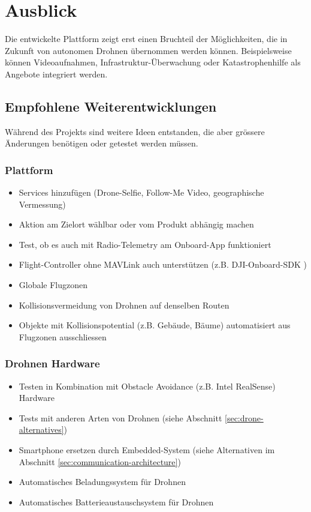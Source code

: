 \section{Ausblick}

Die entwickelte Plattform zeigt erst einen Bruchteil der Möglichkeiten, die in Zukunft von autonomen Drohnen übernommen werden können. Beispielsweise können Videoaufnahmen, Infrastruktur-Überwachung oder Katastrophenhilfe als Angebote integriert werden. 

\subsection{Empfohlene Weiterentwicklungen}

Während des Projekts sind weitere Ideen entstanden, die aber grössere Änderungen benötigen oder getestet werden müssen. 

\subsubsection{Plattform}

\begin{itemize}
	\item Services hinzufügen (Drone-Selfie, Follow-Me Video, geographische Vermessung)
	\item Aktion am Zielort wählbar oder vom Produkt abhängig machen
	\item Test, ob es auch mit Radio-Telemetry am Onboard-App funktioniert
	\item \Gls{Flight-Controller} ohne \Gls{MAVLink} auch unterstützen (z.B. DJI-Onboard-SDK \cite{dji-sdk})
	\item Globale Flugzonen
	\item Kollisionsvermeidung von Drohnen auf denselben Routen
	\item Objekte mit Kollisionspotential (z.B. Gebäude, Bäume) automatisiert aus Flugzonen ausschliessen
\end{itemize}

\subsubsection{Drohnen Hardware} 
\begin{itemize}
	\item Testen in Kombination mit Obstacle Avoidance (z.B. Intel RealSense\cite{realsense}) Hardware
		\item Tests mit anderen Arten von Drohnen (siehe Abschnitt \ref{sec:drone-alternatives})
	\item Smartphone ersetzen durch Embedded-System (siehe Alternativen im Abschnitt \ref{sec:communication-architecture}) 

	\item Automatisches Beladungssystem für Drohnen
	\item Automatisches Batterieaustauschsystem für Drohnen
\end{itemize}  



